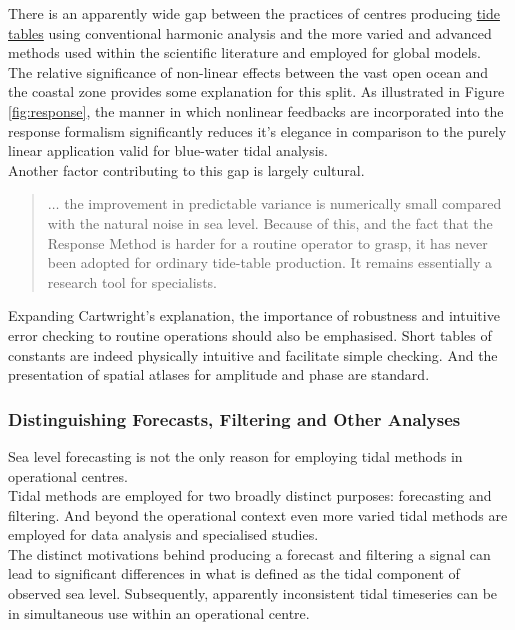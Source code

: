 There is an apparently wide gap between the practices of centres producing \underline{tide tables} using conventional harmonic analysis and the more varied and advanced methods used within the scientific literature and employed for global models.\\
The relative significance of non-linear effects between the vast open ocean and the coastal zone provides some explanation for this split.  As illustrated in Figure \ref{fig:response}, the manner in which nonlinear feedbacks are incorporated into the response formalism significantly reduces it's elegance in comparison to the purely linear application valid for blue-water tidal analysis.\\
Another factor contributing to this gap is largely cultural.
\begin{quotation}
$\dots$ the improvement in predictable variance is numerically small compared with the natural noise in sea level.   Because of this, and the fact that the Response Method is harder for a routine operator to grasp, it has never been adopted for ordinary tide-table production. It remains essentially a research tool for specialists. \citep[pp 198]{Cartwright:2000tt} 
\end{quotation}
Expanding Cartwright's explanation, the importance of robustness and intuitive error checking to routine operations should also be emphasised.  Short tables of constants are indeed physically intuitive and facilitate simple checking.   And the presentation of spatial atlases for amplitude and phase are standard.





\subsubsection{Distinguishing Forecasts, Filtering and Other Analyses}

Sea level forecasting is not the only reason for employing tidal methods in operational centres.\\
Tidal methods are employed for two broadly distinct purposes: forecasting and filtering.  And beyond the operational context even more varied tidal methods are employed for data analysis and specialised studies.\\

The distinct motivations behind producing a forecast and filtering a signal can lead to significant differences in what is defined as the tidal component of observed sea level.   Subsequently, apparently inconsistent tidal timeseries can be in simultaneous use within an operational centre.




